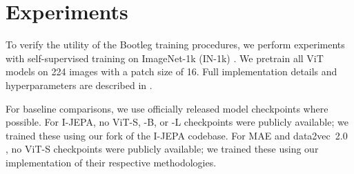 \section{Experiments}

To verify the utility of the Bootleg training procedures, we perform experiments with self-supervised training on ImageNet-1k (IN-1k) \citep{ImageNet}.
We pretrain all ViT models on 224 images with a patch size of 16.
Full implementation details and hyperparameters are described in \iftoggle{arxiv}{\cref{s:pretraining-hparams}}{the supplementary materials}.

For baseline comparisons, we use officially released model checkpoints where possible.
For I-JEPA, no ViT-S, -B, or -L checkpoints were publicly available; we trained these using our fork of the I-JEPA codebase.
For MAE \citep{he2022masked} and data2vec~2.0 \citep{baevski2022data2vec}, no ViT-S checkpoints were publicly available; we trained these using our implementation of their respective methodologies.








